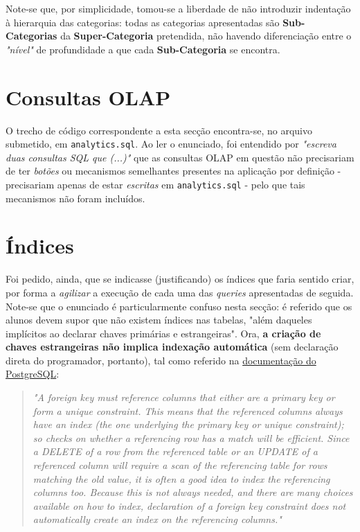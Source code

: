 \documentclass[12pt,a4paper]{article}
\begin{document}
\begin{enumerate}
        Note-se que, por simplicidade, tomou-se a liberdade de não introduzir indentação
        à hierarquia das categorias: todas as categorias apresentadas são
        \textbf{Sub-Categorias} da \textbf{Super-Categoria} pretendida, não havendo diferenciação
        entre o \textit{"nível"} de profundidade a que cada \textbf{Sub-Categoria} se encontra.

\end{enumerate}


\section*{Consultas OLAP}

O trecho de código correspondente a esta secção encontra-se, no arquivo submetido,
em \texttt{analytics.sql}. Ao ler o enunciado, foi entendido por \textit{"escreva
  duas consultas SQL que (...)"} que as consultas OLAP em questão não precisariam
de ter \textit{botões} ou mecanismos semelhantes presentes na aplicação por
definição - precisariam apenas de estar \textit{escritas} em \texttt{analytics.sql} -
pelo que tais mecanismos não foram incluídos.

\section*{Índices}

Foi pedido, ainda, que se indicasse (justificando) os índices que faria sentido
criar, por forma a \textit{agilizar} a execução de cada uma das \textit{queries}
apresentadas de seguida. Note-se que o enunciado é particularmente confuso nesta
secção: é referido que os alunos devem supor que não existem índices nas tabelas,
"além daqueles implícitos ao declarar chaves primárias e estrangeiras". Ora, \textbf{a
  criação de chaves estrangeiras não implica indexação automática} (sem declaração
direta do programador, portanto), tal como referido na
\href{https://www.postgresql.org/docs/current/ddl-constraints.html#DDL-CONSTRAINTS-FK}
{documentação do PostgreSQL}:

\begin{quote}
  \textit{"A foreign key must reference columns that either are a primary key or form a unique
    constraint. This means that the referenced columns always have an index (the one
    underlying the primary key or unique constraint); so checks on whether a referencing
    row has a match will be efficient. Since a DELETE of a row from the referenced
    table or an UPDATE of a referenced column will require a scan of the referencing
    table for rows matching the old value, it is often a good idea to index the referencing
    columns too. Because this is not always needed, and there are many choices available
    on how to index, declaration of a foreign key constraint does not automatically
    create an index on the referencing columns."}
\end{quote}
\end{document}
